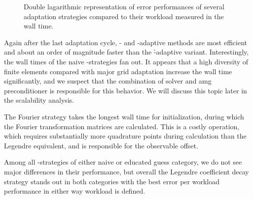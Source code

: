 \begin{figure}
\centering
%
%  
\caption{Double lagarithmic representation of error performances of several adaptation strategies compared to their workload measured in the wall time.}
\label{fig:errorwalltime}
\end{figure}


Again after the last adaptation cycle, \p- and \hp-adaptive methods are most efficient and about an order of magnitude faster than the \h-adaptive variant. Interestingly, the wall times of the naive \hp-strategies fan out. It appears that a high diversity of finite elements compared with major grid adaptation increase the wall time significantly, and we suspect that the combination of solver and \gls{amg} preconditioner is responsible for this behavior. We will discuss this topic later in the scalability analysis.

The Fourier strategy takes the longest wall time for initialization, during which the Fourier transformation matrices are calculated. This is a costly operation, which requires substantially more quadrature points during calculation than the Legendre equivalent, and is responsible for the observable offset.

Among all \hp-strategies of either naive or educated guess category, we do not see major differences in their performance, but overall the Legendre coefficient decay strategy stands out in both categories with the best error per workload performance in either way workload is defined.

